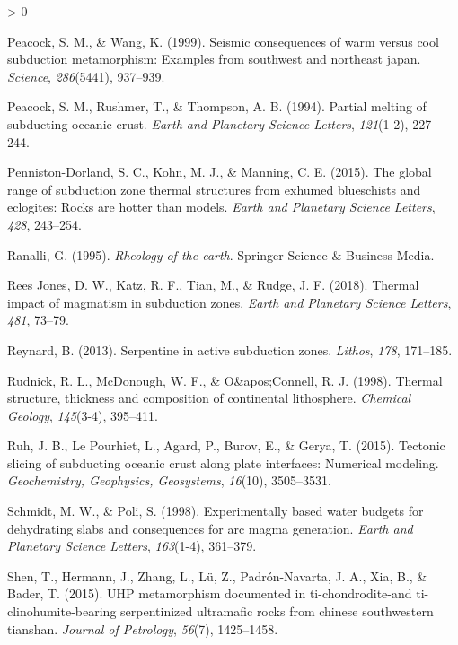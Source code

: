 \documentclass[draft,linenumbers]{agujournal2018}
\newlength{\cslhangindent}
\newenvironment{CSLReferences}[2] %
 {%
  \setlength{\parindent}{0pt}
  \ifodd #1 \everypar{\setlength{\hangindent}{\cslhangindent}}\ignorespaces\fi
  \ifnum #2 > 0
  \setlength{\parskip}{#2\baselineskip}
  \fi
 }%
 {}
\begin{document}
\begin{CSLReferences}{1}{0}
\leavevmode{}%
Peacock, S. M., \& Wang, K. (1999). Seismic consequences of warm versus
cool subduction metamorphism: Examples from southwest and northeast
japan. \emph{Science}, \emph{286}(5441), 937--939.

\leavevmode{}%
Peacock, S. M., Rushmer, T., \& Thompson, A. B. (1994). Partial melting
of subducting oceanic crust. \emph{Earth and Planetary Science Letters},
\emph{121}(1-2), 227--244.

\leavevmode{}%
Penniston-Dorland, S. C., Kohn, M. J., \& Manning, C. E. (2015). The
global range of subduction zone thermal structures from exhumed
blueschists and eclogites: Rocks are hotter than models. \emph{Earth and
Planetary Science Letters}, \emph{428}, 243--254.

\leavevmode{}%
Ranalli, G. (1995). \emph{Rheology of the earth}. Springer Science \&
Business Media.

\leavevmode{}%
Rees Jones, D. W., Katz, R. F., Tian, M., \& Rudge, J. F. (2018).
{Thermal impact of magmatism in subduction zones}. \emph{Earth and
Planetary Science Letters}, \emph{481}, 73--79.

\leavevmode{}%
Reynard, B. (2013). {Serpentine in active subduction zones}.
\emph{Lithos}, \emph{178}, 171--185.

\leavevmode{}%
Rudnick, R. L., McDonough, W. F., \& O\&apos;Connell, R. J. (1998).
{Thermal structure, thickness and composition of continental
lithosphere}. \emph{Chemical Geology}, \emph{145}(3-4), 395--411.

\leavevmode{}%
Ruh, J. B., Le Pourhiet, L., Agard, P., Burov, E., \& Gerya, T. (2015).
{Tectonic slicing of subducting oceanic crust along plate interfaces:
Numerical modeling}. \emph{Geochemistry, Geophysics, Geosystems},
\emph{16}(10), 3505--3531.

\leavevmode{}%
Schmidt, M. W., \& Poli, S. (1998). {Experimentally based water budgets
for dehydrating slabs and consequences for arc magma generation}.
\emph{Earth and Planetary Science Letters}, \emph{163}(1-4), 361--379.

\leavevmode{}%
Shen, T., Hermann, J., Zhang, L., Lü, Z., Padrón-Navarta, J. A., Xia,
B., \& Bader, T. (2015). UHP metamorphism documented in
ti-chondrodite-and ti-clinohumite-bearing serpentinized ultramafic rocks
from chinese southwestern tianshan. \emph{Journal of Petrology},
\emph{56}(7), 1425--1458.


\end{CSLReferences}
\end{document}
